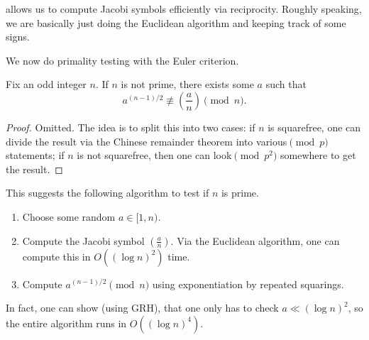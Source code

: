 \documentclass[../notes.tex]{subfiles}
\begin{document}
\begin{remark}
	 allows us to compute Jacobi symbols efficiently via reciprocity. Roughly speaking, we are basically just doing the Euclidean algorithm and keeping track of some signs.
\end{remark}
We now do primality testing with the Euler criterion.
\begin{lemma}
	Fix an odd integer $n$. If $n$ is not prime, there exists some $a$ such that
	\[a^{(n-1)/2}\not\equiv\left(\frac an\right)\pmod n.\]
\end{lemma}
\begin{proof}
	Omitted. The idea is to split this into two cases: if $n$ is squarefree, one can divide the result via the Chinese remainder theorem into various$\pmod p$ statements; if $n$ is not squarefree, then one can look$\pmod{p^2}$ somewhere to get the result.
\end{proof}
This suggests the following algorithm to test if $n$ is prime.
\begin{enumerate}
	\item Choose some random $a\in[1,n)$.
	\item Compute the Jacobi symbol $\left(\frac an\right)$. Via the Euclidean algorithm, one can compute this in $O\left((\log n)^2\right)$ time.
	\item Compute $a^{(n-1)/2}\pmod n$ using exponentiation by repeated squarings.
\end{enumerate}
In fact, one can show (using GRH), that one only has to check $a\ll(\log n)^2$, so the entire algorithm runs in $O\left((\log n)^4\right)$.
\end{document}
